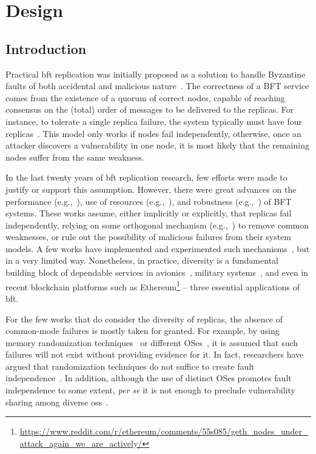 \chapter{\system Design}
\label{chap:lazarus_design}

\section{Introduction}

Practical \gls{bft} replication was initially proposed as a solution to handle Byzantine faults of both accidental and malicious nature~\cite{Castro:1999}.
The correctness of a BFT service comes from the existence of a quorum of correct nodes, capable of reaching consensus on the (total) order of messages to be delivered to the replicas.
For instance, to tolerate a single replica failure, the system typically must have four replicas~\cite{Castro:2002,Kotla:2010,Aublin:2015}. 
This model only works if nodes fail independently, otherwise, once an attacker discovers a vulnerability in one node, it is most likely that the remaining nodes suffer from the same weakness. 

In the last twenty years of \gls{bft} replication research, few efforts were made to justify or support this assumption. 
However, there were great advances on the performance (e.g.,~\cite{Kotla:2010,Aublin:2015,Behl:2015}), use of resources (e.g.,~\cite{Veronese:2013,Behl:2017,Liu:2016,Yin:2003}), and robustness (e.g.,~\cite{Amir:2011,Bessani:2014,Clement:2009b}) of BFT systems.
These works assume, either implicitly or explicitly, that replicas fail independently, relying on some orthogonal mechanism (e.g.,~\cite{Roeder:2010,Chen:1995}) to remove common weaknesses, or rule out the possibility of malicious failures from their system models.
A few works have implemented and experimented such mechanisms~\cite{Rodrigues:2001,Roeder:2010,Amir:2011}, but in a very limited way.
Nonetheless, in practice, diversity is a fundamental building block of dependable services in avionics~\cite{Yeh:2004}, military systems~\cite{rhimes}, and even in recent blockchain platforms such as Ethereum\footnote{\url{https://www.reddit.com/r/ethereum/comments/55s085/geth_nodes_under_attack_again_we_are_actively/}} -- three essential applications of \gls{bft}. 

For the few works that do consider the diversity of replicas, the absence of common-mode failures is mostly taken for granted.
For example, by using memory randomization techniques~\cite{Roeder:2010} or different OSes~\cite{Rodrigues:2001,Junqueira:2005}, it is assumed that such failures will not exist without providing evidence for it. 
In fact, researchers have argued that randomization techniques do not suffice to create fault independence~\cite{Snow:2013,Bittau:2014}.
In addition, although the use of distinct OSes promotes fault independence to some extent, \emph{per se} it is not enough to preclude vulnerability sharing among diverse \glspl{os}~\cite{Garcia:2014}.

